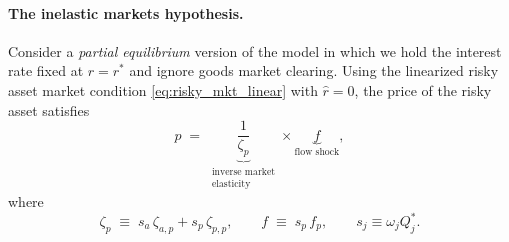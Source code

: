 \documentclass[12pt,english]{article}
\begin{document}


\paragraph{The inelastic markets hypothesis.}
Consider a \emph{partial equilibrium} version of the model in which we hold the interest rate fixed at $r=r^{*}$ and ignore goods market clearing.
Using the linearized risky asset market condition \eqref{eq:risky_mkt_linear} with $\hat r=0$, the price of the risky asset satisfies
\begin{equation}\label{eq:mkt-elasticity-pe}
    \hat{p}
    \;=\;
    \underbrace{\frac{1}{\zeta_p}}_{\substack{\text{inverse market}\\ \text{elasticity}}}
    \times
    \underbrace{f}_{\text{flow shock}},
\end{equation}
where
\[
\zeta_p \;\equiv\; s_a\,\zeta_{a,p} + s_p\,\zeta_{p,p},
\qquad
f \;\equiv\; s_p\,f_p,
\qquad
s_j \equiv \omega_j Q_j^{*}.
\]
\end{document}
